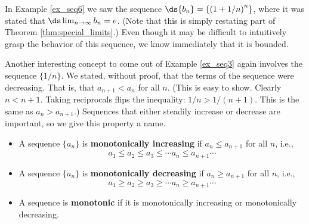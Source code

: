 
In Example \ref{ex_seq6} we saw the sequence $\ds \{b_n\} = \left\{\left(1+1/n\right)^{n}\right\}$, where it was stated that $\ds \lim_{n\to\infty} b_n = e$. (Note that this is simply restating part of Theorem \ref{thm:special_limits}.) Even though it may be difficult to intuitively grasp the behavior of this sequence, we know immediately that it is bounded.

Another interesting concept to come out of Example \ref{ex_seq3} again involves the sequence $\{1/n\}$. We stated, without proof, that the terms of the sequence were decreasing. That is, that $a_{n+1} < a_n$ for all $n$. (This is easy to show. Clearly $n < n+1$. Taking reciprocals flips the inequality: $1/n > 1/(n+1)$. This is the same as $a_n > a_{n+1}$.) Sequences that either steadily increase or decrease are important, so we give this property a name.

{\begin{itemize}
\item		A sequence $\{a_n\}$ is \textbf{monotonically increasing} if $a_n \leq a_{n+1}$ for all $n$, i.e.,
 $$a_1 \leq a_2 \leq a_3 \leq \cdots a_n \leq a_{n+1} \cdots$$
 \item	A sequence $\{a_n\}$ is \textbf{monotonically decreasing} if $a_n \geq a_{n+1}$ for all $n$, i.e.,
 $$a_1 \geq a_2 \geq a_3 \geq \cdots a_n \geq a_{n+1} \cdots$$
 \item	A sequence is \textbf{monotonic} if it is monotonically increasing or monotonically decreasing.
 \end{itemize}
}


